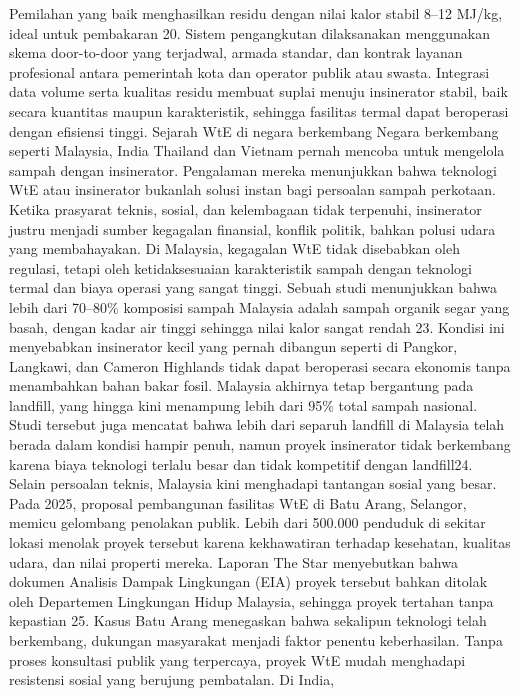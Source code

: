\documentclass[
  letterpaper,
  DIV=11,
  numbers=noendperiod]{scrreprt}
\begin{document}
Pemilahan yang baik menghasilkan residu dengan nilai kalor stabil 8--12
MJ/kg, ideal untuk pembakaran 20. Sistem pengangkutan dilaksanakan
menggunakan skema door-to-door yang terjadwal, armada standar, dan
kontrak layanan profesional antara pemerintah kota dan operator publik
atau swasta. Integrasi data volume serta kualitas residu membuat suplai
menuju insinerator stabil, baik secara kuantitas maupun karakteristik,
sehingga fasilitas termal dapat beroperasi dengan efisiensi tinggi.
Sejarah WtE di negara berkembang Negara berkembang seperti Malaysia,
India Thailand dan Vietnam pernah mencoba untuk mengelola sampah dengan
insinerator. Pengalaman mereka menunjukkan bahwa teknologi WtE atau
insinerator bukanlah solusi instan bagi persoalan sampah perkotaan.
Ketika prasyarat teknis, sosial, dan kelembagaan tidak terpenuhi,
insinerator justru menjadi sumber kegagalan finansial, konflik politik,
bahkan polusi udara yang membahayakan. Di Malaysia, kegagalan WtE tidak
disebabkan oleh regulasi, tetapi oleh ketidaksesuaian karakteristik
sampah dengan teknologi termal dan biaya operasi yang sangat tinggi.
Sebuah studi menunjukkan bahwa lebih dari 70--80\% komposisi sampah
Malaysia adalah sampah organik segar yang basah, dengan kadar air tinggi
sehingga nilai kalor sangat rendah 23. Kondisi ini menyebabkan
insinerator kecil yang pernah dibangun seperti di Pangkor, Langkawi, dan
Cameron Highlands tidak dapat beroperasi secara ekonomis tanpa
menambahkan bahan bakar fosil. Malaysia akhirnya tetap bergantung pada
landfill, yang hingga kini menampung lebih dari 95\% total sampah
nasional. Studi tersebut juga mencatat bahwa lebih dari separuh landfill
di Malaysia telah berada dalam kondisi hampir penuh, namun proyek
insinerator tidak berkembang karena biaya teknologi terlalu besar dan
tidak kompetitif dengan landfill24. Selain persoalan teknis, Malaysia
kini menghadapi tantangan sosial yang besar. Pada 2025, proposal
pembangunan fasilitas WtE di Batu Arang, Selangor, memicu gelombang
penolakan publik. Lebih dari 500.000 penduduk di sekitar lokasi menolak
proyek tersebut karena kekhawatiran terhadap kesehatan, kualitas udara,
dan nilai properti mereka. Laporan The Star menyebutkan bahwa dokumen
Analisis Dampak Lingkungan (EIA) proyek tersebut bahkan ditolak oleh
Departemen Lingkungan Hidup Malaysia, sehingga proyek tertahan tanpa
kepastian 25. Kasus Batu Arang menegaskan bahwa sekalipun teknologi
telah berkembang, dukungan masyarakat menjadi faktor penentu
keberhasilan. Tanpa proses konsultasi publik yang terpercaya, proyek WtE
mudah menghadapi resistensi sosial yang berujung pembatalan. Di India,
\end{document}
